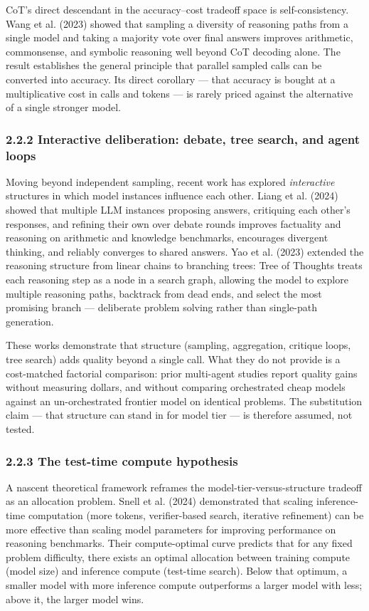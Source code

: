 \documentclass[11pt,a4paper]{article}
\begin{document}
CoT's direct descendant in the accuracy–cost tradeoff space is
self-consistency. Wang et al. (2023) showed that sampling a diversity of
reasoning paths from a single model and taking a majority vote over final
answers improves arithmetic, commonsense, and symbolic reasoning well beyond
CoT decoding alone. The result establishes the general principle that
parallel sampled calls can be converted into accuracy. Its direct corollary
— that accuracy is bought at a multiplicative cost in calls and tokens —
is rarely priced against the alternative of a single stronger model.

\subsubsection{2.2.2 Interactive deliberation: debate, tree search, and agent loops}

Moving beyond independent sampling, recent work has explored \textit{interactive}
structures in which model instances influence each other. Liang et al.
(2024) showed that multiple LLM instances proposing answers, critiquing each
other's responses, and refining their own over debate rounds improves
factuality and reasoning on arithmetic and knowledge benchmarks, encourages
divergent thinking, and reliably converges to shared answers. Yao et al.
(2023) extended the reasoning structure from linear chains to branching
trees: Tree of Thoughts treats each reasoning step as a node in a search
graph, allowing the model to explore multiple reasoning paths, backtrack
from dead ends, and select the most promising branch — deliberate problem
solving rather than single-path generation.

These works demonstrate that structure (sampling, aggregation, critique
loops, tree search) adds quality beyond a single call. What they do not
provide is a cost-matched factorial comparison: prior multi-agent studies
report quality gains without measuring dollars, and without comparing
orchestrated cheap models against an un-orchestrated frontier model on
identical problems. The substitution claim — that structure can stand in
for model tier — is therefore assumed, not tested.

\subsubsection{2.2.3 The test-time compute hypothesis}

A nascent theoretical framework reframes the model-tier-versus-structure
tradeoff as an allocation problem. Snell et al. (2024) demonstrated that
scaling inference-time computation (more tokens, verifier-based search,
iterative refinement) can be more effective than scaling model parameters
for improving performance on reasoning benchmarks. Their compute-optimal
curve predicts that for any fixed problem difficulty, there exists an
optimal allocation between training compute (model size) and inference
compute (test-time search). Below that optimum, a smaller model with more
inference compute outperforms a larger model with less; above it, the
larger model wins.
\end{document}
